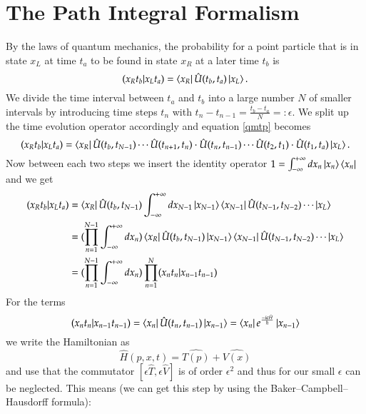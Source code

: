 \section{The Path Integral Formalism}

By the laws of quantum mechanics, the probability for a point particle that is in state $x_L$ at time $t_a$ to be found in state $x_R$ at a later time $t_b$ is
\begin{equation} \label{qmtp}
  (x_R t_b | x_L t_a) = \bra{x_R}\hat{U}(t_b,t_a)\ket{x_L}.
\end{equation}
We divide the time interval between $t_a$ and $t_b$ into a large number $N$ of smaller intervals by introducing time steps $t_n$ with $t_n -t_{n-1} = \frac{t_b - t_a}{N} =:\epsilon$. We split up the time evolution operator accordingly and equation \ref{qmtp} becomes
\begin{equation} \label{qmtpn}
  (x_R t_b | x_L t_a) = \bra{x_R}\hat{U}(t_b,t_{N-1}) \cdots \hat{U}(t_{n+1},t_n)\cdot\hat{U}(t_n,t_{n-1}) \cdots \hat{U}(t_2,t_1)\cdot\hat{U}(t_1,t_a)\ket{x_L}.
\end{equation}
Now between each two steps we insert the identity operator $1 = \int_{-\infty}^{+\infty} dx_n \ket{x_n}\bra{x_n}$ and we get 
\begin{align} \label{tpi}
  (x_R t_b | x_L t_a) &=  \bra{x_R}\hat{U}(t_b,t_{N-1}) \int_{-\infty}^{+\infty} dx_{N-1} \ket{x_{N-1}}\bra{x_{N-1}} \hat{U}(t_{N-1},t_{N-2}) \cdots \ket{x_L} \\
                      &=  (\prod_{n=1}^{N-1} \int_{-\infty}^{+\infty} dx_{n}) \bra{x_R}\hat{U}(t_b,t_{N-1})  \ket{x_{N-1}}\bra{x_{N-1}} \hat{U}(t_{N-1},t_{N-2}) \cdots \ket{x_L} \\
                      &=  (\prod_{n=1}^{N-1} \int_{-\infty}^{+\infty} dx_{n})\prod_{n=1}^{N} (x_n t_n | x_{n-1} t_{n-1})
\end{align}
For the terms 
\begin{equation}\label{tpn}
  (x_n t_n | x_{n-1} t_{n-1}) = \bra{x_n} \hat{U}(t_{n},t_{n-1}) \ket{x_{n-1}} = \bra{x_n} e^{\frac{-i \epsilon \hat{H}}{\hbar}} \ket{x_{n-1}} 
\end{equation}
we write the Hamiltonian as
\begin{equation}\label{HTV}
  \hat{H}(p,x,t) = \hat{T(p)} + \hat{V(x)}
\end{equation}
and use that the commutator $[\epsilon \hat{T}, \epsilon \hat{V}]$ is of order $\epsilon^2$ and thus for our small $\epsilon$ can be neglected. This means (we can get this step by using the Baker–Campbell–Hausdorff formula):
